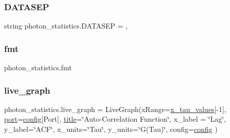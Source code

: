 \mbox{\label{namespacephoton__statistics_ab381c3496e1a3a8d6dae99e66447c10c}} 
\subsubsection{\texorpdfstring{D\+A\+T\+A\+S\+EP}{DATASEP}}
{\footnotesize\ttfamily string photon\+\_\+statistics.\+D\+A\+T\+A\+S\+EP = \textquotesingle{},\textquotesingle{}}

\mbox{\label{namespacephoton__statistics_a0e1aee8b528dd37bb27185509aa5af09}} 
\subsubsection{\texorpdfstring{fmt}{fmt}}
{\footnotesize\ttfamily photon\+\_\+statistics.\+fmt}

\mbox{\label{namespacephoton__statistics_a75ad62bb71f891a32137fe2fd41d40d9}} 
\subsubsection{\texorpdfstring{live\+\_\+graph}{live\_graph}}
{\footnotesize\ttfamily photon\+\_\+statistics.\+live\+\_\+graph = Live\+Graph(x\+Range=\hyperlink{namespacephoton__statistics_a930bc99eb656180a9ae6318b16d77976}{x\+\_\+tau\+\_\+values}\mbox{[}-\/1\mbox{]}, \hyperlink{namespacephoton__statistics_a09fecae480663af684a1d523466242a4}{port}=\hyperlink{namespacephoton__statistics_a4176c548148b1c86da6ddf320ab00e90}{config}\mbox{[}\textquotesingle{}Port\textquotesingle{}\mbox{]}, \hyperlink{namespacephoton__statistics_a76d9f47b30df749d7d370e77849ca649}{title}=\char`\"{}Auto-\/Correlation Function\char`\"{}, x\+\_\+label = \char`\"{}Lag\char`\"{}, y\+\_\+label=\char`\"{}A\+CF\char`\"{}, x\+\_\+units=\char`\"{}Tau\char`\"{}, y\+\_\+units=\char`\"{}G(Tau)\char`\"{}, config=\hyperlink{namespacephoton__statistics_a4176c548148b1c86da6ddf320ab00e90}{config} )}

